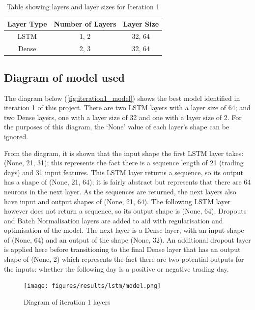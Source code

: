 \begin{table}[ht]
    \centering
    \begin{tabular}{|c|c|c|}
        \hline
        Layer Type & Number of Layers & Layer Size \\
        \hline\hline
        LSTM & 1, 2 & 32, 64 \\
        Dense & 2, 3 & 32, 64 \\
        \hline
    \end{tabular}
    \caption{Table showing layers and layer sizes for Iteration 1}
    \label{tab:iteration1_layers}
\end{table}
\FloatBarrier

\subsection{Diagram of model used}
The diagram below (\autoref{fig:iteration1_model}) shows the best model identified in iteration 1 of this project.
There are two LSTM layers with a layer size of 64; and two Dense layers, one with a layer size of 32 and one with
a layer size of 2. For the purposes of this diagram, the `None' value of each layer's shape can be ignored.

From the diagram, it is shown that the input shape the first LSTM layer takes: (None, 21, 31); this represents the
fact there is a sequence length of 21 (trading days) and 31 input features.  This LSTM layer returns a sequence, so its
output has a shape of (None, 21, 64); it is fairly abstract but represents that there are 64 neurons in the next layer.
As the sequences are returned, the next layers also have input and output shapes of (None, 21, 64). The following LSTM
layer however does not return a sequence, so its output shape is (None, 64).
Dropouts and Batch Normalisation layers are added to aid with regularisation and optimisation of the model.
The next layer is a Dense layer, with an input shape of (None, 64) and an output of the shape (None, 32). An additional
dropout layer is applied here before transitioning to the final Dense layer that has an output shape of (None, 2)
which represents the fact there are two potential outputs for the inputs: whether the following day
is a positive or negative trading day.

\begin{figure}[ht]
    \centering
    \texttt{[image: figures/results/lstm/model.png]}
    \caption[Diagram of iteration 1 layers]{Diagram of iteration 1 layers}
    \label{fig:iteration1_model}
\end{figure}
\FloatBarrier

